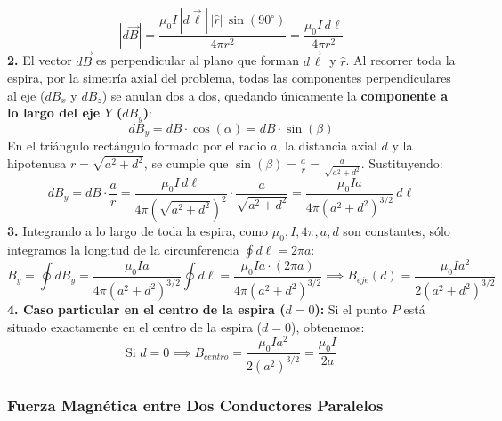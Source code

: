 \begin{ejercicio}
\begin{equation}
    |d\vec{B}| = \frac{\mu_0 I\, |d\vec{\ell}|\, |\hat{r}|\, \sin(90^\circ)}{4\pi r^2} = \frac{\mu_0 I\, d\ell}{4\pi r^2}
\end{equation}
\textbf{2.} El vector $d\vec{B}$ es perpendicular al plano que forman $d\vec{\ell}$ y $\hat{r}$. Al recorrer toda la espira, por la simetría axial del problema, todas las componentes perpendiculares al eje ($dB_x$ y $dB_z$) se anulan dos a dos, quedando únicamente la \textbf{componente a lo largo del eje $Y$ ($dB_y$)}:
\begin{equation}
    dB_y = dB \cdot \cos(\alpha) = dB \cdot \sin(\beta)
\end{equation}
En el triángulo rectángulo formado por el radio $a$, la distancia axial $d$ y la hipotenusa $r = \sqrt{a^2 + d^2}$, se cumple que $\sin(\beta) = \frac{a}{r} = \frac{a}{\sqrt{a^2 + d^2}}$. Sustituyendo:
\begin{equation}
    dB_y = dB \cdot \frac{a}{r} = \frac{\mu_0 I\, d\ell}{4\pi (\sqrt{a^2 + d^2})^2} \cdot \frac{a}{\sqrt{a^2 + d^2}} = \frac{\mu_0 I a}{4\pi (a^2 + d^2)^{3/2}}\, d\ell
\end{equation}
\textbf{3.} Integrando a lo largo de toda la espira, como $\mu_0, I, 4\pi, a, d$ son constantes, sólo integramos la longitud de la circunferencia $\oint d\ell = 2\pi a$:
\begin{equation}
    B_y = \oint dB_y = \frac{\mu_0 I a}{4\pi (a^2 + d^2)^{3/2}} \oint d\ell = \frac{\mu_0 I a \cdot (2\pi a)}{4\pi (a^2 + d^2)^{3/2}} \implies \boxed{B_{eje}(d) = \frac{\mu_0 I a^2}{2 (a^2 + d^2)^{3/2}}}
\end{equation}
\textbf{4. Caso particular en el centro de la espira ($d = 0$):}
Si el punto $P$ está situado exactamente en el centro de la espira ($d = 0$), obtenemos:
\begin{equation}
    \boxed{\text{Si } d = 0 \implies B_{centro} = \frac{\mu_0 I a^2}{2 (a^2)^{3/2}} = \frac{\mu_0 I}{2a}}
\end{equation}
\end{ejercicio}

\subsubsection{Fuerza Magnética entre Dos Conductores Paralelos}

